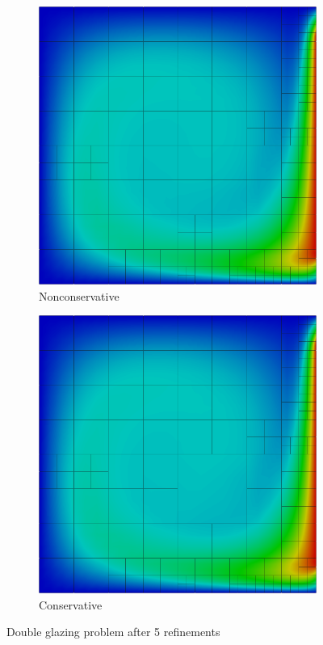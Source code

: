 \documentclass[letterpaper]{article}
\begin{document}
\begin{figure}[p]
\centering
\begin{subfigure}[t]{0.45\textwidth}
\centering
\includegraphics[width=\textwidth]{figs/DoubleGlazing/modified5nc.png}
\caption{Nonconservative}
\label{fig:doubleglazingGraph6c}
\end{subfigure}
\begin{subfigure}[t]{0.45\textwidth}
\centering
\includegraphics[width=\textwidth]{figs/DoubleGlazing/modified5c.png}
\caption{Conservative}
\label{fig:doubleglazingRobust6c}
\end{subfigure}
\caption{Double glazing problem after 5 refinements}
\label{fig:doubleglazing}
\end{figure}
\end{document}
